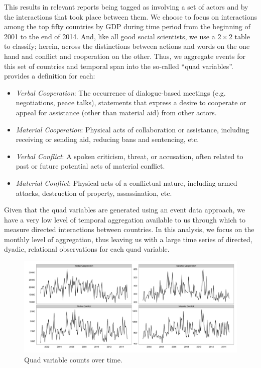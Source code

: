 \documentclass[3p,times,twocolumn,authoryear,12pt]{elsarticle}
\begin{document}
This results in relevant reports being tagged as involving a set of actors and by the interactions that took place between them. We choose to focus on interactions among the top fifty countries by GDP during time period from the beginning of 2001 to the end of 2014. And, like all good social scientists, we use a $2 \times 2$ table to classify; herein, across the distinctions between actions and words on the one hand and conflict and cooperation on the other.  Thus, we aggregate events for this set of countries and temporal span into the so-called ``quad variables''. \citet{yonamine:2011} provides a definition for each:

\begin{itemize}
	\item \emph{Verbal Cooperation}: The occurrence of dialogue-based meetings (e.g. negotiations, peace talks), statements that express a desire to cooperate or appeal for assistance (other than material aid) from other actors.
	\item \emph{Material Cooperation}: Physical acts of collaboration or assistance, including receiving or sending aid, reducing bans and sentencing, etc.
	\item \emph{Verbal Conflict}: A spoken criticism, threat, or accusation, often related to past or future potential acts of material conflict.
	\item \emph{Material Conflict}: Physical acts of a conflictual nature, including armed attacks, destruction of property, assassination, etc.
\end{itemize}

Given that the quad variables are generated using an event data approach, we have a very low level of temporal aggregation available to us through which to measure directed interactions between countries. In this analysis, we focus on the monthly level of aggregation, thus leaving us with a large time series of directed, dyadic, relational observations for each quad variable. 

\begin{figure}[ht]
	\centering
	\includegraphics[width=1\textwidth]{dvMonthly}
	\caption{Quad variable counts over time.}
	\label{fig:dvAgg}
\end{figure}
\end{document}

